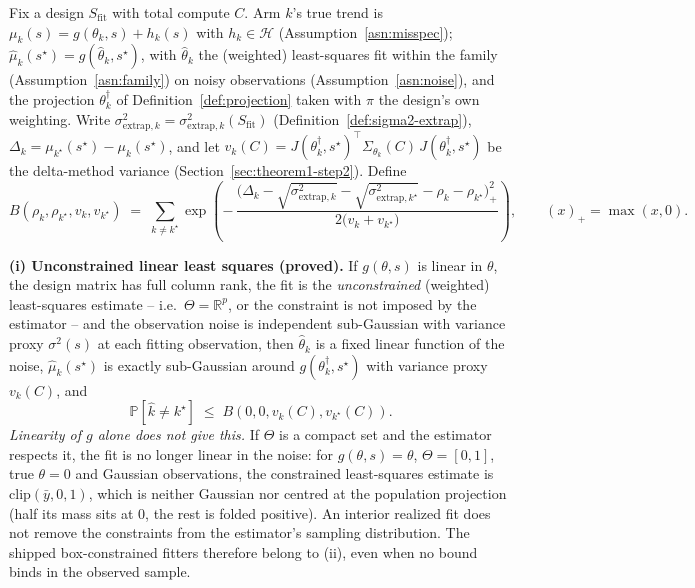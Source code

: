 \begin{theorem}
\label{thm:main-bound}
Fix a design $S_{\mathrm{fit}}$ with total compute $C$. Arm $k$'s true trend is
$\mu_k(s) = g(\theta_k, s) + h_k(s)$ with $h_k \in \mathcal{H}$
(Assumption~\ref{asn:misspec}); $\hat\mu_k(s^\star) = g(\hat\theta_k, s^\star)$, with
$\hat\theta_k$ the (weighted) least-squares fit within the family
(Assumption~\ref{asn:family}) on noisy observations (Assumption~\ref{asn:noise}), and the
projection $\theta_k^{\dagger}$ of Definition~\ref{def:projection} taken with $\pi$ the
design's own weighting. Write $\sigma^2_{\mathrm{extrap}, k}
= \sigma^2_{\mathrm{extrap}, k}(S_{\mathrm{fit}})$ (Definition~\ref{def:sigma2-extrap}),
$\Delta_k = \mu_{k^\star}(s^\star) - \mu_k(s^\star)$, and let
$v_k(C) = J(\theta_k^{\dagger}, s^\star)^\top \Sigma_{\theta_k}(C) \, J(\theta_k^{\dagger},
s^\star)$ be the delta-method variance (Section~\ref{sec:theorem1-step2}). Define
\[
  B(\rho_k, \rho_{k^\star}, v_k, v_{k^\star}) \;=\; \sum_{k \ne k^\star}
  \exp\!\left(
    -\, \frac{\Big( \Delta_k - \sqrt{\sigma^2_{\mathrm{extrap}, k}}
      - \sqrt{\sigma^2_{\mathrm{extrap}, k^\star}} - \rho_k - \rho_{k^\star} \Big)_+^2}
    {2 \big( v_k + v_{k^\star} \big)}
  \right),
  \qquad (x)_+ = \max(x, 0).
\]

\textbf{(i) Unconstrained linear least squares (proved).} If $g(\theta, s)$ is linear in
$\theta$, the design matrix has full column rank, the fit is the \emph{unconstrained}
(weighted) least-squares estimate -- i.e.\ $\Theta = \mathbb{R}^p$, or the constraint is
not imposed by the estimator -- and the observation noise is independent sub-Gaussian
with variance proxy $\sigma^2(s)$ at each fitting observation, then $\hat\theta_k$ is a
fixed linear function of the noise, $\hat\mu_k(s^\star)$ is exactly sub-Gaussian around
$g(\theta_k^{\dagger}, s^\star)$ with variance proxy $v_k(C)$, and
\[
  \mathbb{P}[\hat{k} \ne k^\star] \;\le\; B(0, 0, v_k(C), v_{k^\star}(C)).
\]
\emph{Linearity of $g$ alone does not give this.} If $\Theta$ is a compact set and the
estimator respects it, the fit is no longer linear in the noise: for $g(\theta, s) =
\theta$, $\Theta = [0, 1]$, true $\theta = 0$ and Gaussian observations, the constrained
least-squares estimate is $\mathrm{clip}(\bar y, 0, 1)$, which is neither Gaussian nor
centred at the population projection (half its mass sits at $0$, the rest is folded
positive). An interior realized fit does not remove the constraints from the
estimator's sampling distribution. The shipped box-constrained fitters therefore
belong to (ii), even when no bound binds in the observed sample.


\end{theorem}
